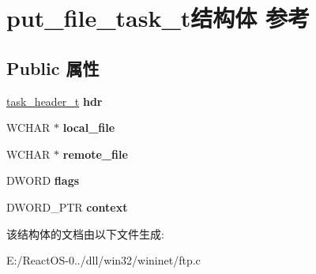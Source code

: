 \hypertarget{structput__file__task__t}{}\section{put\+\_\+file\+\_\+task\+\_\+t结构体 参考}
\label{structput__file__task__t}
\subsection*{Public 属性}
\begin{DoxyCompactItemize}
\item 
\mbox{\label{structput__file__task__t_a1c36f768c2d9c4721e148147c1eb08a9}} 
\hyperlink{structtask__header__t}{task\+\_\+header\+\_\+t} {\bfseries hdr}
\item 
\mbox{\label{structput__file__task__t_a9f029936ed9d36a9cafe64bde15131bd}} 
W\+C\+H\+AR $\ast$ {\bfseries local\+\_\+file}
\item 
\mbox{\label{structput__file__task__t_a3b373236ba6a1feabc06598ee96a2995}} 
W\+C\+H\+AR $\ast$ {\bfseries remote\+\_\+file}
\item 
\mbox{\label{structput__file__task__t_af4e1138ea0a5f094e700d3449b0ee262}} 
D\+W\+O\+RD {\bfseries flags}
\item 
\mbox{\label{structput__file__task__t_a2c474c44565a00808c660f12a74a8457}} 
D\+W\+O\+R\+D\+\_\+\+P\+TR {\bfseries context}
\end{DoxyCompactItemize}


该结构体的文档由以下文件生成\+:\begin{DoxyCompactItemize}
\item 
E\+:/\+React\+O\+S-\/0../dll/win32/wininet/ftp.\+c\end{DoxyCompactItemize}
